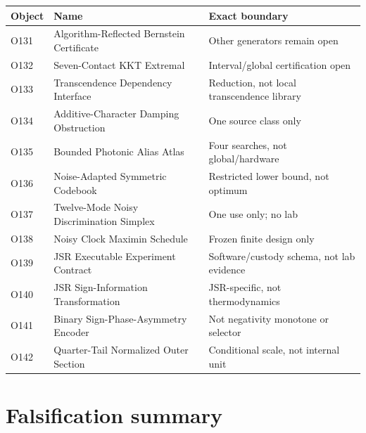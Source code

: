 \documentclass[11pt,a4paper,openany]{report}
\begin{document}
\small
\begin{longtable}{@{}p{}p{}p{}@{}}
\toprule
\textbf{Object} & \textbf{Name} & \textbf{Exact boundary}\\
\midrule
\endhead
O131 & Algorithm-Reflected Bernstein Certificate & Other generators remain open\\
O132 & Seven-Contact KKT Extremal & Interval/global certification open\\
O133 & Transcendence Dependency Interface & Reduction, not local transcendence library\\
O134 & Additive-Character Damping Obstruction & One source class only\\
O135 & Bounded Photonic Alias Atlas & Four searches, not global/hardware\\
O136 & Noise-Adapted Symmetric Codebook & Restricted lower bound, not optimum\\
O137 & Twelve-Mode Noisy Discrimination Simplex & One use only; no lab\\
O138 & Noisy Clock Maximin Schedule & Frozen finite design only\\
O139 & JSR Executable Experiment Contract & Software/custody schema, not lab evidence\\
O140 & JSR Sign-Information Transformation & JSR-specific, not thermodynamics\\
O141 & Binary Sign-Phase-Asymmetry Encoder & Not negativity monotone or selector\\
O142 & Quarter-Tail Normalized Outer Section & Conditional scale, not internal unit\\
\bottomrule
\end{longtable}
\normalsize

\chapter{Falsification summary}
\end{document}
